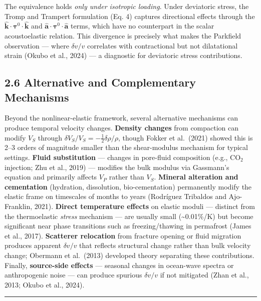 \documentclass[draft]{agujournal2019}
\begin{document}
The equivalence holds \emph{only under isotropic loading}. Under
deviatoric stress, the Tromp and Trampert formulation (Eq. 4) captures
directional effects through the
\(\hat{\mathbf{k}} \cdot \boldsymbol{\tau}^0 \cdot \hat{\mathbf{k}}\)
and
\(\hat{\mathbf{a}} \cdot \boldsymbol{\tau}^0 \cdot \hat{\mathbf{a}}\)
terms, which have no counterpart in the scalar acoustoelastic relation.
This divergence is precisely what makes the Parkfield observation ---
where \(\delta v/v\) correlates with contractional but not dilatational
strain (Okubo et al., 2024) --- a diagnostic for deviatoric stress
contributions.

\subsection{2.6 Alternative and Complementary
Mechanisms}\label{alternative-and-complementary-mechanisms}

Beyond the nonlinear-elastic framework, several alternative mechanisms
can produce temporal velocity changes. \textbf{Density changes} from
compaction can modify \(V_S\) through
\(\delta V_S/V_S = -\frac{1}{2}\delta\rho/\rho\), though Fokker et
al.~(2021) showed this is 2--3 orders of magnitude smaller than the
shear-modulus mechanism for typical settings. \textbf{Fluid
substitution} --- changes in pore-fluid composition (e.g., CO\(_2\)
injection; Zhu et al., 2019) --- modifies the bulk modulus via
Gassmann's equation and primarily affects \(V_P\) rather than \(V_S\).
\textbf{Mineral alteration and cementation} (hydration, dissolution,
bio-cementation) permanently modify the elastic frame on timescales of
months to years (Rodríguez Tribaldos and Ajo-Franklin, 2021).
\textbf{Direct temperature effects} on elastic moduli --- distinct from
the thermoelastic \emph{stress} mechanism --- are usually small
(\textasciitilde{}0.01\%/K) but become significant near phase
transitions such as freezing/thawing in permafrost (James et al., 2017).
\textbf{Scatterer relocation} from fracture opening or fluid migration
produces apparent \(\delta v/v\) that reflects structural change rather
than bulk velocity change; Obermann et al.~(2013) developed theory
separating these contributions. Finally, \textbf{source-side effects}
--- seasonal changes in ocean-wave spectra or anthropogenic noise ---
can produce spurious \(\delta v/v\) if not mitigated (Zhan et al., 2013;
Okubo et al., 2024).

\begin{center}\rule{0.5\linewidth}{0.5pt}\end{center}
\end{document}

